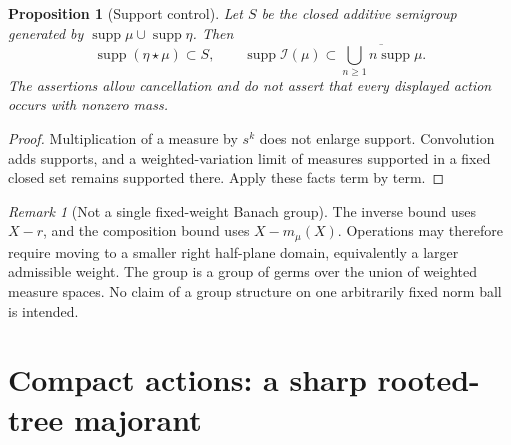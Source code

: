 \documentclass[11pt,a4paper]{article}
\newtheorem{proposition}[theorem]{Proposition}
\theoremstyle{definition}
\theoremstyle{remark}
\newtheorem{remark}[theorem]{Remark}
\newcommand{\Inv}{\mathcal I}
\newcommand{\supp}{\operatorname{supp}}
\numberwithin{equation}{section}
\begin{document}
\begin{proposition}[Support control]\label{prop:support}
Let $S$ be the closed additive semigroup generated by $\supp\mu\cup\supp\eta$. Then
\[
 \supp(\eta\star\mu)\subset S,
 \qquad
 \supp\Inv(\mu)\subset
 \overline{\bigcup_{n\ge1}n\supp\mu}.
\]
The assertions allow cancellation and do not assert that every displayed action occurs with nonzero mass.
\end{proposition}
\begin{proof}
Multiplication of a measure by $s^k$ does not enlarge support. Convolution adds supports, and a weighted-variation limit of measures supported in a fixed closed set remains supported there. Apply these facts term by term.
\end{proof}

\begin{remark}[Not a single fixed-weight Banach group]
The inverse bound uses $X-r$, and the composition bound uses $X-m_\mu(X)$. Operations may therefore require moving to a smaller right half-plane domain, equivalently a larger admissible weight. The group is a group of germs over the union of weighted measure spaces. No claim of a group structure on one arbitrarily fixed norm ball is intended.
\end{remark}

\section{Compact actions: a sharp rooted-tree majorant}\label{sec:compact}
\end{document}
